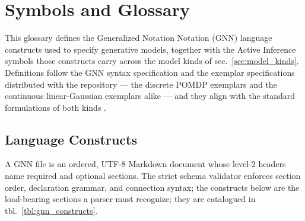 \documentclass[
  english,
  9pt,
]{extarticle}
\begin{document}
\newpage

\section{Symbols and Glossary}\label{sec:symbols_glossary}

This glossary defines the Generalized Notation Notation (GNN) language
constructs used to specify generative models, together with the Active
Inference symbols those constructs carry across the model kinds of
sec.~\ref{sec:model_kinds}. Definitions follow the GNN syntax
specification and the exemplar specifications distributed with the
repository --- the discrete POMDP exemplars and the continuous
linear-Gaussian exemplars alike --- and they align with the standard
formulations of both kinds \citep{gnn2023, dacosta2020, parr2022}.

\subsection{Language Constructs}\label{language-constructs}

A GNN file is an ordered, UTF-8 Markdown document whose level-2 headers
name required and optional sections. The strict schema validator
enforces section order, declaration grammar, and connection syntax; the
constructs below are the load-bearing sections a parser must recognize;
they are catalogued in tbl.~\ref{tbl:gnn_constructs}.
\end{document}
